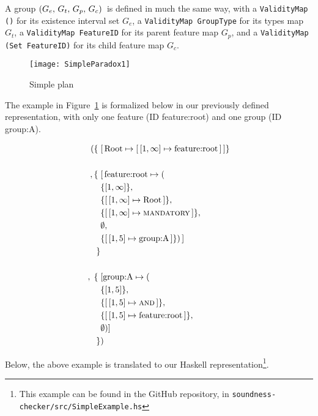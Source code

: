 A group $\left(G_e,\, G_t,\, G_p,\, G_c\right){}$ is defined in much the same way, with a \texttt{Validity\-Map ()} for its existence interval set $G_e$, a \texttt{Validity\-Map Group\-Type} for its types map $G_t$, a \texttt{Validity\-Map Feature\-ID} for its parent feature map $G_p$, and a \texttt{Validity\-Map (Set Feature\-ID)} for its child feature map $G_c$. 

\begin{figure}
   \centering
      \texttt{[image: SimpleParadox1]}
   \caption{Simple plan}
   \label{ex:simple-plan}
\end{figure}

The example in Figure~\ref{ex:simple-plan} is formalized below in our previously defined representation, with only one feature (ID feature:root) and one group (ID group:A).

\begin{align*}
 ( \{ \; & \mapping{\text{Root}}{\intervalmapping{1}{\forever}{\text{feature:root}}} \} \\
    \\
    ,\{\; & \mapping{\text{feature:root}}{( \\
          & \{ \interval{1}{\forever}\} ,\, \\
          & \{\intervalmapping{1}{\forever}{\text{Root}}\} ,\, \\
          & \{\intervalmapping{1}{\forever}{\mandatory{}}\} ,\, \\
          &  \emptyset ,\, \\ 
          & \{\intervalmapping{1}{5}{\text{group:A}}\} ) } \\
       \} &\\
          \\
            ,\; \{ \; & [ \text{group:A} \mapsto ( \\
                      & \{\interval{1}{5}\} ,\, \\
                      & \{\intervalmapping{1}{5}{\andtype{}}\} ,\, \\
                      & \{\intervalmapping{1}{5}{\text{feature:root}}\} ,\, \\
                      & \emptyset ) ]\\
 \}&)\\
\end{align*}

Below, the above example is translated to our Haskell representation\footnote{This example can be found in the GitHub repository, in \texttt{soundness-checker/\allowbreak src/\allowbreak SimpleExample.hs}}.

